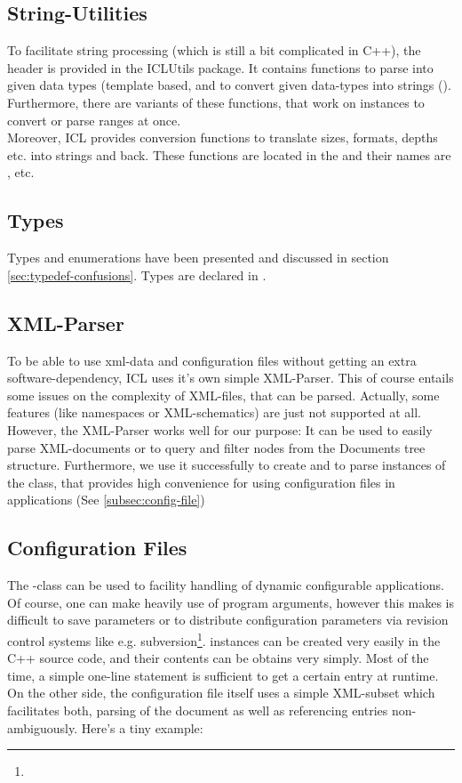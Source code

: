 \subsection{String-Utilities}
To facilitate string processing (which is still a bit complicated in C++), the header  is provided in the ICLUtils package. It contains functions to parse  into given data types (template based,  and to convert given data-types into strings (). Furthermore, there are variants of these functions, that work on  instances to convert or parse ranges at once.\\
Moreover, ICL provides conversion functions to translate sizes, formats, depths etc. into strings and back. These functions are located in the  and their names are ,  etc.

\subsection{Types}
Types and enumerations have been presented and discussed in section \ref{sec:typedef-confusions}. Types are declared in .

\subsection{XML-Parser}
To be able to use xml-data and configuration files without getting an extra software-dependency, ICL uses it's own simple XML-Parser. This of course entails some issues on the complexity of XML-files, that can be parsed. Actually, some features (like namespaces or XML-schematics) are just not supported at all.\\
However, the XML-Parser works well for our purpose: It can be used to easily parse XML-documents or to query and filter nodes from the Documents tree structure. Furthermore, we use it successfully to create and to parse instances of the  class, that provides high convenience for using configuration files in applications (See \ref{subsec:config-file})

\subsection{Configuration Files\label{subsec:config-file}}
The -class can be used to facility handling of dynamic configurable applications. Of course, one can make heavily use of program arguments, however this makes is difficult to save parameters or to distribute configuration parameters via revision control systems like e.g. subversion\footnote{}.  instances can be created very easily in the C++ source code, and their contents can be obtains very simply. Most of the time, a simple one-line statement is sufficient to get a certain entry at runtime. On the other side, the configuration file itself uses a simple XML-subset which facilitates both, parsing of the document as well as referencing entries non-ambiguously. Here's a tiny example:

